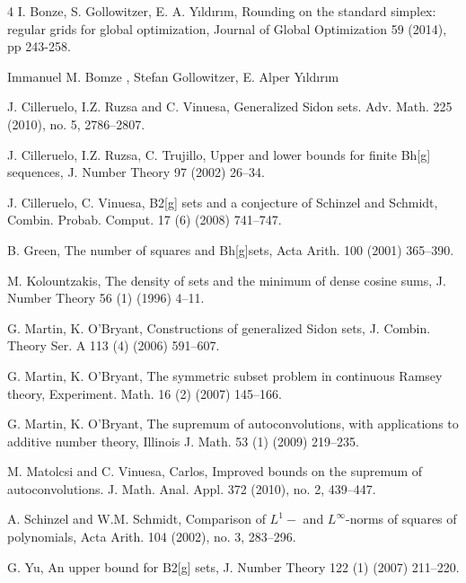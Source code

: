 \documentclass[10pt]{amsart}
\begin{document}
\vspace{-4pt}

\begin{thebibliography}{4}
 I. Bonze, S. Gollowitzer, E. A. Yıldırım, Rounding on the standard simplex: regular grids for global optimization, 
Journal of Global Optimization 59  (2014), pp 243-258.

Immanuel M. Bomze , Stefan Gollowitzer, E. Alper Yıldırım

 J. Cilleruelo, I.Z. Ruzsa and C. Vinuesa, Generalized Sidon sets. Adv. Math. 225 (2010), no. 5, 
2786--2807. 

 J. Cilleruelo, I.Z. Ruzsa, C. Trujillo, Upper and lower bounds for finite Bh[g] sequences, J. Number Theory 97 (2002) 26--34.

  J. Cilleruelo, C. Vinuesa, B2[g] sets and a conjecture of Schinzel and Schmidt, Combin. Probab. Comput. 17 (6) (2008) 741--747.

  B. Green, The number of squares and Bh[g]sets, Acta Arith. 100 (2001) 365--390.

 M. Kolountzakis, The density of sets and the minimum of dense cosine sums, J. Number Theory 56 (1) (1996) 4--11.

 G. Martin, K. O'Bryant, Constructions of generalized Sidon sets, J. Combin. Theory Ser. A 113 (4) (2006) 591--607.

 G. Martin, K. O'Bryant, The symmetric subset problem in continuous Ramsey theory, 
Experiment. Math. 16 (2) (2007) 145--166.

  G. Martin, K. O'Bryant, The supremum of autoconvolutions, with applications to additive number theory, Illinois J. Math. 53 (1) (2009) 219--235.

 M. Matolcsi and C. Vinuesa, Carlos, Improved bounds on the supremum of autoconvolutions. 
J. Math. Anal. Appl. 372 (2010), no. 2, 439--447.

 A. Schinzel and W.M. Schmidt, Comparison of $L^1-$ and $L^{\infty}$-norms of squares of polynomials, Acta Arith. 104 (2002), no. 3, 283--296. 

  G. Yu, An upper bound for B2[g] sets, J. Number Theory 122 (1) (2007) 211--220.

\end{thebibliography}
\end{document}
